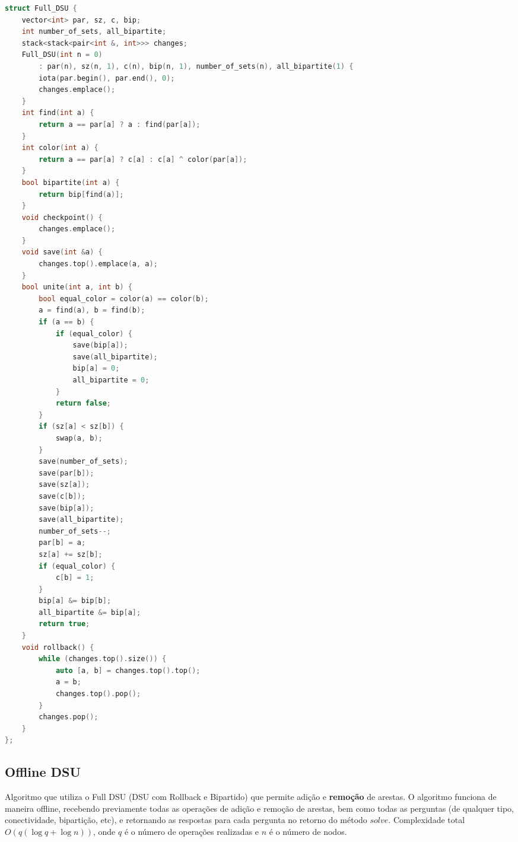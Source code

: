 \documentclass[11pt, a4paper, oneside]{book}
\begin{document}
\begin{multicols}{2}
\begin{lstlisting}[language=C++]
struct Full_DSU {
    vector<int> par, sz, c, bip;
    int number_of_sets, all_bipartite;
    stack<stack<pair<int &, int>>> changes;
    Full_DSU(int n = 0)
        : par(n), sz(n, 1), c(n), bip(n, 1), number_of_sets(n), all_bipartite(1) {
        iota(par.begin(), par.end(), 0);
        changes.emplace();
    }
    int find(int a) {
        return a == par[a] ? a : find(par[a]);
    }
    int color(int a) {
        return a == par[a] ? c[a] : c[a] ^ color(par[a]);
    }
    bool bipartite(int a) {
        return bip[find(a)];
    }
    void checkpoint() {
        changes.emplace();
    }
    void save(int &a) {
        changes.top().emplace(a, a);
    }
    bool unite(int a, int b) {
        bool equal_color = color(a) == color(b);
        a = find(a), b = find(b);
        if (a == b) {
            if (equal_color) {
                save(bip[a]);
                save(all_bipartite);
                bip[a] = 0;
                all_bipartite = 0;
            }
            return false;
        }
        if (sz[a] < sz[b]) {
            swap(a, b);
        }
        save(number_of_sets);
        save(par[b]);
        save(sz[a]);
        save(c[b]);
        save(bip[a]);
        save(all_bipartite);
        number_of_sets--;
        par[b] = a;
        sz[a] += sz[b];
        if (equal_color) {
            c[b] = 1;
        }
        bip[a] &= bip[b];
        all_bipartite &= bip[a];
        return true;
    }
    void rollback() {
        while (changes.top().size()) {
            auto [a, b] = changes.top().top();
            a = b;
            changes.top().pop();
        }
        changes.pop();
    }
};\end{lstlisting}
\end{multicols}

\hfill

\subsection{Offline DSU}


Algoritmo que utiliza o Full DSU (DSU com Rollback e Bipartido) que permite adição e \textbf{remoção} de arestas. O algoritmo funciona de maneira offline, recebendo previamente todas as operações de adição e remoção de arestas, bem como todas as perguntas (de qualquer tipo, conectividade, bipartição, etc), e retornando as respostas para cada pergunta no retorno do método $solve$. Complexidade total $O(q (\log q + \log n))$, onde $q$ é o número de operações realizadas e $n$ é o número de nodos.
\hfill
\end{document}

